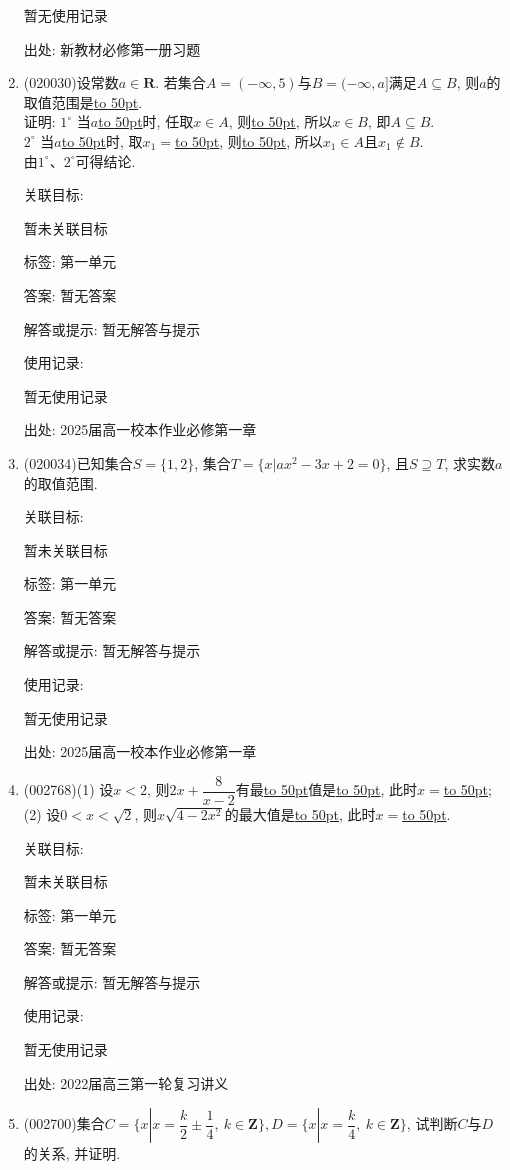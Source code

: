 \documentclass[10pt,a4paper]{article}
\newcommand{\blank}[1]{\underline{\hbox to #1pt{}}}
\begin{document}
\begin{enumerate}[1.]
暂无使用记录


出处: 新教材必修第一册习题
\item { (020030)}设常数$a\in \mathbf{R}$. 若集合$A=(-\infty ,5)$与$B=(-\infty ,a]$满足$A\subseteq B$, 则$a$的取值范围是\blank{50}.\\
证明: $1^\circ$ 当$a$\blank{50}时, 任取$x\in A$, 则\blank{50}, 所以$x\in B$, 即$A\subseteq B$.\\ 
$2^\circ$ 当$a$\blank{50}时, 取$x_1=$\blank{50}, 则\blank{50}, 所以$x_1\in A$且$x_1\not \in B$.\\
由$1^\circ$、$2^\circ$可得结论.


关联目标:

暂未关联目标



标签: 第一单元

答案: 暂无答案

解答或提示: 暂无解答与提示

使用记录:

暂无使用记录


出处: 2025届高一校本作业必修第一章
\item { (020034)}已知集合$S=\{1, 2\}$, 集合$T=\{x|ax^2-3x+2=0\}$, 且$S\supseteq T$, 求实数$a$的取值范围.


关联目标:

暂未关联目标



标签: 第一单元

答案: 暂无答案

解答或提示: 暂无解答与提示

使用记录:

暂无使用记录


出处: 2025届高一校本作业必修第一章
\item { (002768)}(1) 设$x<2$, 则$2x+\dfrac 8{x-2}$有最\blank{50}值是\blank{50}, 此时$x=$\blank{50};\\
(2) 设$0<x<\sqrt 2$, 则$x\sqrt{4-2{x^2}}$的最大值是\blank{50}, 此时$x=$\blank{50}.


关联目标:

暂未关联目标



标签: 第一单元

答案: 暂无答案

解答或提示: 暂无解答与提示

使用记录:

暂无使用记录


出处: 2022届高三第一轮复习讲义
\item { (002700)}集合$C=\{x|x=\dfrac k2\pm \dfrac14, \ k\in \mathbf{Z}\},D=\{x|x=\dfrac k4,\ k\in \mathbf{Z}\}$, 试判断$C$与$D$的关系, 并证明.



\end{enumerate}
\end{document}
